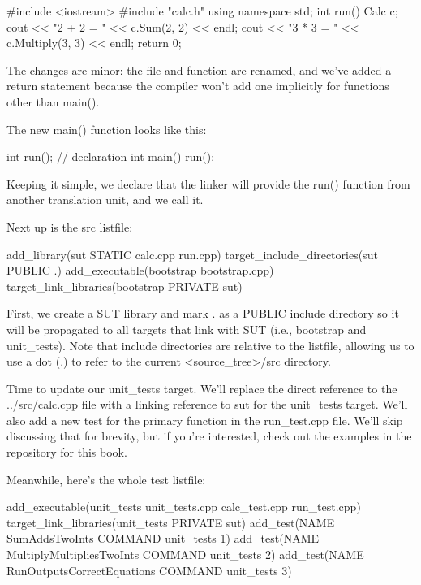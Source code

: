 
\begin{cpp}
#include <iostream>
#include "calc.h"
using namespace std;
int run() {
    Calc c;
    cout << "2 + 2 = " << c.Sum(2, 2) << endl;
    cout << "3 * 3 = " << c.Multiply(3, 3) << endl;
    return 0;
}
\end{cpp}

The changes are minor: the file and function are renamed, and we’ve added a return statement because the compiler won’t add one implicitly for functions other than main().

The new main() function looks like this:


\begin{cpp}
int run(); // declaration
int main() {
    run();
}
\end{cpp}

Keeping it simple, we declare that the linker will provide the run() function from another translation unit, and we call it.

Next up is the src listfile:


\begin{cmake}
add_library(sut STATIC calc.cpp run.cpp)
target_include_directories(sut PUBLIC .)
add_executable(bootstrap bootstrap.cpp)
target_link_libraries(bootstrap PRIVATE sut)
\end{cmake}

First, we create a SUT library and mark . as a PUBLIC include directory so it will be propagated to all targets that link with SUT (i.e., bootstrap and unit\_tests). Note that include directories are relative to the listfile, allowing us to use a dot (.) to refer to the current <source\_tree>/src directory.

Time to update our unit\_tests target. We’ll replace the direct reference to the ../src/calc.cpp file with a linking reference to sut for the unit\_tests target. We’ll also add a new test for the primary function in the run\_test.cpp file. We’ll skip discussing that for brevity, but if you’re interested, check out the examples in the repository for this book.

Meanwhile, here’s the whole test listfile:


\begin{cmake}
add_executable(unit_tests
               unit_tests.cpp
               calc_test.cpp
               run_test.cpp)
target_link_libraries(unit_tests PRIVATE sut)
add_test(NAME SumAddsTwoInts COMMAND unit_tests 1)
add_test(NAME MultiplyMultipliesTwoInts COMMAND unit_tests 2)
add_test(NAME RunOutputsCorrectEquations COMMAND unit_tests 3)
\end{cmake}

